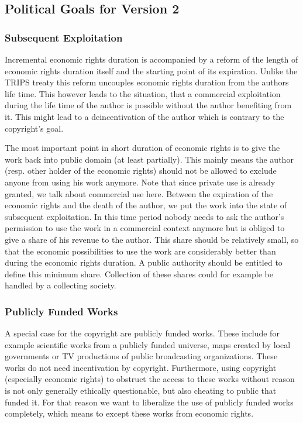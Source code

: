 \subsection{Political Goals for Version 2}

\subsubsection{Subsequent Exploitation}

Incremental economic rights duration is accompanied by a reform of the length of economic rights duration itself and the starting point of its expiration. Unlike the TRIPS treaty this reform uncouples economic rights duration from the authors life time. This however leads to the situation, that a commercial exploitation during the life time of the author is possible without the author benefiting from it. This might lead to a deincentivation of the author which is contrary to the copyright's goal.

The most important point in short duration of economic rights is to give the work back into public domain (at least partially). This mainly means the author (resp. other holder of the economic rights) should not be allowed to exclude anyone from using his work anymore. Note that since private use is already granted, we talk about commercial use here. Between the expiration of the economic rights and the death of the author, we put the work into the state of subsequent exploitation. In this time period nobody needs to ask the author's permission to use the work in a commercial context anymore but is obliged to give a share of his revenue to the author. This share should be relatively small, so that the economic possibilities to use the work are considerably better than during the economic rights duration. A public authority should be entitled to define this minimum share. Collection of these shares could for example be handled by a collecting society.

\subsubsection{Publicly Funded Works}

A special case for the copyright are publicly funded works. These include for example scientific works from a publicly funded universe, maps created by local governments or TV productions of public broadcasting organizations. These works do not need incentivation by copyright. Furthermore, using copyright (especially economic rights) to obstruct the access to these works without reason is not only generally ethically questionable, but also cheating to public that funded it. For that reason we want to liberalize the use of publicly funded works completely, which means to except these works from economic rights.

